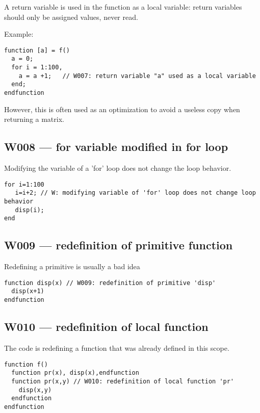 A return variable is used in the function as a local variable:
 return variables should only be assigned values, never read.



Example:\begin{verbatim}
function [a] = f()
  a = 0;
  for i = 1:100,
    a = a +1;   // W007: return variable "a" used as a local variable
  end;
endfunction
\end{verbatim}




However, this is often used as an optimization to avoid
a useless copy when returning a matrix.



\subsection{W008 --- for variable modified in for loop}




Modifying the variable of a 'for' loop does not change the
loop behavior.

\begin{verbatim}
for i=1:100
   i=i+2; // W: modifying variable of 'for' loop does not change loop behavior
   disp(i);
end
\end{verbatim}


\subsection{W009 --- redefinition of primitive function}




Redefining a primitive is usually a bad idea

\begin{verbatim}
function disp(x) // W009: redefinition of primitive 'disp'
  disp(x+1)
endfunction
\end{verbatim}


\subsection{W010 --- redefinition of local function}




The code is redefining a function that was already defined in this scope.

\begin{verbatim}
function f()
  function pr(x), disp(x),endfunction
  function pr(x,y) // W010: redefinition of local function 'pr'
    disp(x,y)
  endfunction
endfunction

\end{verbatim}


